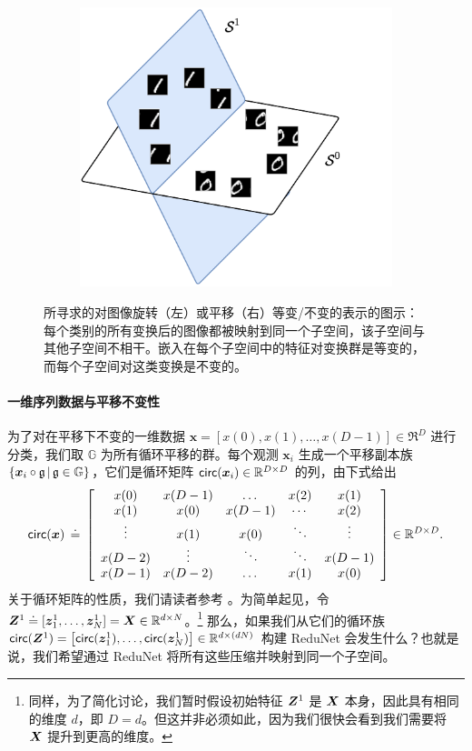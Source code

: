 \documentclass[../../book-main.tex]{subfiles}
\begin{document}
\begin{figure}[t]
\begin{subfigure}[t]{0.4\textwidth}
        \includegraphics[width=\textwidth]{figs_chap4/ortho_diagram_2d.pdf}
    \end{subfigure}
    \caption{所寻求的对图像旋转（左）或平移（右）等变/不变的表示的图示：每个类别的所有变换后的图像都被映射到同一个子空间，该子空间与其他子空间不相干。嵌入在每个子空间中的特征对变换群是等变的，而每个子空间对这类变换是不变的。}\label{fig:ortho-invariance-diagram}
\end{figure}

\paragraph{一维序列数据与平移不变性} 为了对在平移下不变的一维数据 $\bm x = [x(0), x(1), \ldots, x(D-1)] \in \Re^D$ 进行分类，我们取 $\mathbb{G}$ 为所有循环平移的群。每个观测 $\bm x_i$ 生成一个平移副本族 $\{ \bm{x}_i \circ \mathfrak{g} \, | \, \mathfrak{g} \in \mathbb G \}$，它们是循环矩阵 $\mathsf{circ}(\bm x_i) \in \mathbb{R}^{D \times D}$ 的列，由下式给出
\begin{equation}
\mathsf{circ}(\bm{x}) \,\doteq\, \left[ \begin{array}{ccccc} x(0) & x(D-1) & \dots & x(2) & x(1) \\ x(1) & x(0) & x(D-1) & \cdots & x(2) \\ \vdots & x(1) & x(0) &\ddots & \vdots \\ x(D-2) &  \vdots & \ddots & \ddots & x(D-1) \\ x(D-1) & x(D-2) & \dots & x(1) & x(0)   \end{array} \right]  \in \mathbb{R}^{D \times D}.
\end{equation}
关于循环矩阵的性质，我们请读者参考 \cite{Kra2012OnCM}。为简单起见，令 $\bm Z^1 \doteq [ \bm{z}_{1}^1, \dots, \bm{z}_{N}^1 ] = \bm{X} \in \mathbb{R}^{d \times N}$。\footnote{同样，为了简化讨论，我们暂时假设初始特征 $\bm{Z}^1$ 是 $\bm{X}$ 本身，因此具有相同的维度 $d$，即 $D=d$。但这并非必须如此，因为我们很快会看到我们需要将 $\bm{X}$ 提升到更高的维度。} 那么，如果我们从它们的循环族 $\mathsf{circ}(\bm Z^1) = \left[ \mathsf{circ}(\bm{z}_{1}^1), \dots, \mathsf{circ}(\bm{z}_{N}^1) \right] \in \mathbb{R}^{d \times (dN)}$ 构建 ReduNet 会发生什么？也就是说，我们希望通过 ReduNet 将所有这些压缩并映射到同一个子空间。
\end{document}
